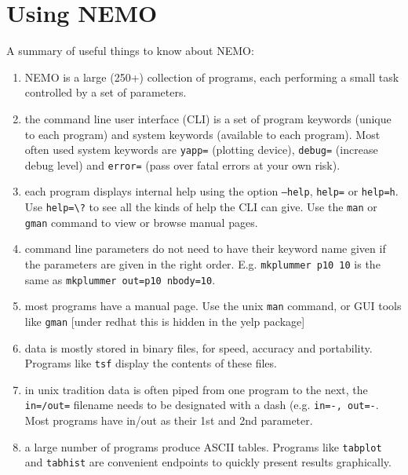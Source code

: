 \chapter                {Using NEMO}

A summary of useful things to know about NEMO:
\begin{enumerate}

\item
NEMO is a large (250+) collection of programs, each performing a small task
controlled by a set of parameters.

\item
the command line user interface (CLI) is a set of program keywords
(unique to each program) and system keywords (available to each program).
Most often used system keywords are {\tt yapp=} (plotting device),
{\tt debug=} (increase debug level) and {\tt error=} (pass over fatal errors
at your own risk).

\item
each program displays internal help using the option 
{\tt --help}, {\tt help=} or {\tt help=h}. Use \verb+help=\?+ to see
all the kinds of help the CLI can give. Use
the {\tt man} or {\tt gman} command to view or browse manual pages.

\item
command line parameters do not need to have their keyword name given
if the parameters are given in the right order. 
E.g. {\tt mkplummer p10 10} is the same as 
{\tt mkplummer out=p10 nbody=10}.

\item
most programs have a manual page. Use the unix {\tt man} command, or
GUI tools like {\tt gman}  [under redhat this is hidden in the yelp package]

\item
data is mostly stored in binary files, for speed, accuracy and portability.
Programs like {\tt tsf} display the contents of these files.

\item
in unix tradition data is often piped from one program to the next, the
{\tt in=/out=} filename  needs to be designated with a dash 
(e.g. {\tt in=-, out=-}.   Most programs have in/out as their 1st and 
2nd parameter.

\item
a large number of programs produce ASCII tables. Programs like
{\tt tabplot} and {\tt tabhist} are convenient endpoints to
quickly present results graphically.

\end{enumerate}

